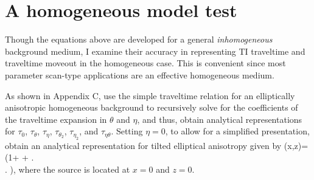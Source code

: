 \section{A homogeneous model test}

Though the equations above are developed for a general {\emph{inhomogeneous}} background medium, I examine their accuracy in representing
TI traveltime and traveltime moveout in the homogeneous case. This is convenient since most parameter scan-type applications 
are   an effective homogeneous medium.

As shown in Appendix C,   use the simple traveltime relation for an elliptically anisotropic homogeneous background 
 to recursively solve for the 
coefficients of the traveltime expansion in $\theta$ and  $\eta$, and thus, obtain
analytical representations for   $\tau_{0}$, $\tau_{\theta}$,
$\tau_{\eta}$, $\tau_{\theta_2}$, $\tau_{\eta_2}$, and $\tau_{\eta \theta}$. Setting
$\eta=0$,  to allow for a simplified presentation,
   obtain an analytical representation  for tilted elliptical anisotropy given by
\beqa
\tau(x,z)= 
   \left(1+ + \right. \nonumber \\ \left. \right),
\label{eqn:eikeqn2}
\eeqa
where the source is located at $x=0$ and $z=0$.

